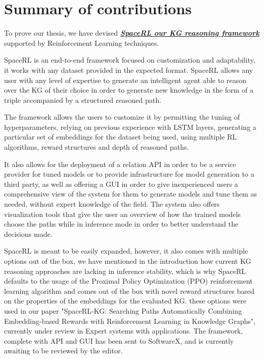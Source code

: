\section{Summary of contributions}\label{sec:intro-summary}
To prove our thesis, we have devised \href{https://github.com/DEAL-US/SpaceRL-KG}{\textbf{\textit{SpaceRL our KG reasoning framework}}} supported by Reinforcement Learning techniques.

SpaceRL is an end-to-end framework focused on customization and adaptability, it works with any dataset provided in the expected format. SpaceRL allows any user with any level of expertise to generate an intelligent agent able to reason over the KG of their choice in order to generate new knowledge in the form of a triple accompanied by a structured reasoned path.

The framework allows the users to customize it by permitting the tuning of hyperparameters, relying on previous experience with LSTM layers, generating a particular set of embeddings for the dataset being used, using multiple RL algorithms, reward structures and depth of reasoned paths.

It also allows for the deployment of a relation API in order to be a service provider for tuned models or to provide infrastructure for model generation to a third party, as well as offering a GUI in order to give inexperienced users a comprehensive view of the system for them to generate models and tune them as needed, without expert knowledge of the field. The system also offers visualization tools that give the user an overview of how the trained models choose the paths while in inference mode in order to better understand the decisions made.

SpaceRL is meant to be easily expanded, however, it also comes with multiple options out of the box, we have mentioned in the introduction how current KG reasoning approaches are lacking in inference stability, which is why SpaceRL defaults to the usage of the Proximal Policy Optimization (PPO) reinforcement learning algorithm and comes out of the box with novel reward structures based on the properties of the embeddings for the evaluated KG. these options were used in our paper "SpaceRL-KG: Searching Paths Automatically Combining Embedding-based Rewards with Reinforcement Learning in Knowledge Graphs", currently under review in Expert systems with applications. The framework, complete with API and GUI has been sent to SoftwareX, and is currently awaiting to be reviewed by the editor.

